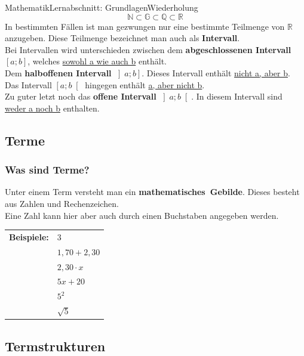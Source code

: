 \documentclass[11pt,twocolumn,oneside,openany,headings=optiontotoc,11pt,numbers=noenddot]{article}
\begin{document}
\begin{worksheet}{Mathematik}{Lernabschnitt: Grundlagen}{Wiederholung}
		\[\mathbb{N} \subset \mathbb{G} \subset \mathbb{Q} \subset \mathbb{R}\]
		In bestimmten Fällen ist man gezwungen nur eine bestimmte Teilmenge von \(\mathbb{R}\) anzugeben. Diese Teilmenge bezeichnet man auch als \textbf{Intervall}.\\
		Bei Intervallen wird unterschieden zwischen dem \textbf{abgeschlossenen Intervall} \(\left[a;b\right]\), welches \underline{sowohl a wie auch b} enthält.\\
		Dem \textbf{halboffenen Intervall} \(\left]a;b\right]\). Dieses Intervall enthält \underline{nicht a, aber b}. Das Intervall \(\left[a;b\right[\) hingegen enthält \underline{a, aber nicht b}.\\
		Zu guter letzt noch das \textbf{offene Intervall} \(\left]a;b\right[\). In diesem Intervall sind \underline{weder a noch b} enthalten.
		\subsection{Terme}
		\subsubsection*{Was sind Terme?} Unter einem Term versteht man ein \mbox{\textbf{mathematisches Gebilde}}. Dieses besteht aus Zahlen und Rechenzeichen.\\
		Eine Zahl kann hier aber auch durch einen Buchstaben angegeben werden.\\
		\par
		\begin{tabularx}{0.5\textwidth}{ll}
			\noindent
			\textbf{Beispiele:} & \(3\)\\
			& \(1,70+2,30\)\\
			& \(2,30\cdot x\)\\
			& \(5x + 20\)\\
			& \(5^2\)\\
			& \(\sqrt{5}\)\\
		\end{tabularx}
		\subsection{Termstrukturen}

\end{worksheet}
\end{document}
